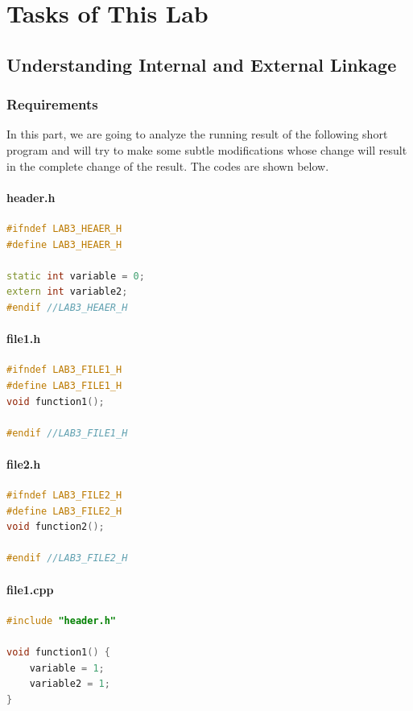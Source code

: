 \documentclass[a4paper]{report}
\begin{document}
\chapter{Tasks of This Lab}
\section{Understanding Internal and External Linkage}
\subsection{Requirements}
In this part, we are going to analyze the running result of the following short program and will try to make some subtle modifications whose change will result in the complete change of the result.
The codes are shown below.

\subsubsection{header.h}
\begin{lstlisting}[language=C++]
#ifndef LAB3_HEAER_H
#define LAB3_HEAER_H

static int variable = 0;
extern int variable2;
#endif //LAB3_HEAER_H

\end{lstlisting}


\subsubsection{file1.h}
\begin{lstlisting}[language=C++]
#ifndef LAB3_FILE1_H
#define LAB3_FILE1_H
void function1();

#endif //LAB3_FILE1_H

\end{lstlisting}

\subsubsection{file2.h}
\begin{lstlisting}[language=C++]
#ifndef LAB3_FILE2_H
#define LAB3_FILE2_H
void function2();

#endif //LAB3_FILE2_H

\end{lstlisting}


\subsubsection{file1.cpp}
\begin{lstlisting}[language=C++]
#include "header.h"

void function1() {
    variable = 1;
    variable2 = 1;
}
\end{lstlisting}
\end{document}

